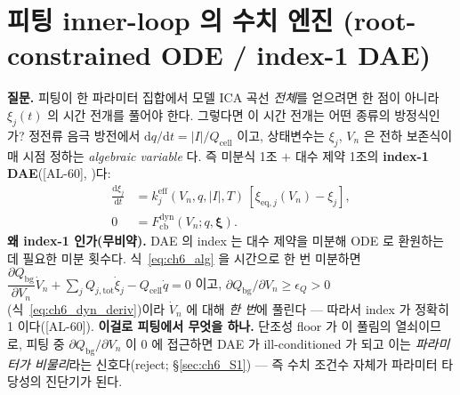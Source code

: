 \documentclass[11pt,a4paper]{article}
\newcommand{\dd}{\mathrm{d}}
\newcommand{\eff}{\mathrm{eff}}
\newcommand{\eq}{\mathrm{eq}}
\newcommand{\bg}{\mathrm{bg}}
\newcommand{\cell}{\mathrm{cell}}
\newcommand{\tot}{\mathrm{tot}}
\newcommand{\cb}{\mathrm{cb}}
\newcommand{\dyn}{\mathrm{dyn}}
\newcommand{\AL}[1]{\textsf{[AL-#1]}}
\begin{document}
\section{피팅 inner-loop 의 수치 엔진 (root-constrained ODE / index-1 DAE)}\label{sec:ch6_dae}
\textbf{질문.} 피팅이 한 파라미터 집합에서 모델 ICA 곡선 \emph{전체}를 얻으려면 한 점이 아니라 $\xi_j(t)$ 의 시간
전개를 풀어야 한다. 그렇다면 이 시간 전개는 어떤 종류의 방정식인가? 정전류 음극 방전에서 $\dd q/\dd t=|I|/Q_\cell$
이고, 상태변수는 $\xi_j$, $V_n$ 은 전하 보존식이 매 시점 정하는 \emph{algebraic variable} 다. 즉 미분식 1조
$+$ 대수 제약 1조의 \textbf{index-1 DAE}(\AL{60}, \cite{brenan1996,hindmarsh2005})다:
\begin{align}
\frac{\dd\xi_j}{\dd t}&=k_j^{\eff}(V_n,q,|I|,T)\,[\xi_{\eq,j}(V_n)-\xi_j],\label{eq:ch6_ode}\\
0&=F_\cb^\dyn(V_n;q,\bm\xi).\label{eq:ch6_alg}
\end{align}
\textbf{왜 index-1 인가(무비약).} DAE 의 index 는 대수 제약을 미분해 ODE 로 환원하는 데 필요한 미분 횟수다.
식~\eqref{eq:ch6_alg} 을 시간으로 한 번 미분하면 $\dfrac{\partial Q_\bg}{\partial V_n}\dot V_n+\sum_j Q_{j,\tot}
\dot\xi_j-Q_\cell\dot q=0$ 이고, $\partial Q_\bg/\partial V_n\ge\epsilon_Q>0$(식~\eqref{eq:ch6_dyn_deriv})이라
$\dot V_n$ 에 대해 \emph{한 번}에 풀린다 — 따라서 index 가 정확히 1 이다(\AL{60}).
\textbf{이걸로 피팅에서 무엇을 하나.} 단조성 floor 가 이 풀림의 열쇠이므로, 피팅 중 $\partial Q_\bg/\partial V_n$
이 0 에 접근하면 DAE 가 ill-conditioned 가 되고 이는 \emph{파라미터가 비물리}라는 신호다(reject; \S\ref{sec:ch6_S1})
— 즉 수치 조건수 자체가 파라미터 타당성의 진단기가 된다.
\end{document}
